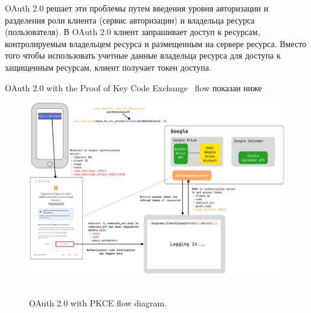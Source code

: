 OAuth 2.0 решает эти проблемы путем введения уровня авторизации и разделения роли клиента (сервис авторизации) и владельца ресурса (пользователя).
В OAuth 2.0 клиент запрашивает доступ к ресурсам, контролируемым владельцем ресурса и размещенным на сервере ресурса.
Вместо того чтобы использовать учетные данные владельца ресурса для доступа к защищенным ресурсам, клиент получает токен доступа.

OAuth 2.0 with the Proof of Key Code Exchange~\cite{bradley2015rfc} flow показан ниже
\begin{figure}[H]
    \centering
    \includegraphics[width=1\textwidth]{img/OAuthPkceScheme_1570_1055}
    ~\caption{OAuth 2.0 with PKCE flow diagram.}
\end{figure}

